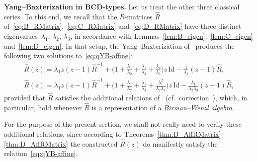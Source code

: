 \documentclass[10pt,a4paper]{amsart}
\numberwithin{equation}{section}
\newcommand{\Id}{\mathrm{Id}}
\begin{document}
\textbf{Yang--Baxterization in $\boldsymbol{BCD}$-types.}
Let us treat the other three classical series. To this end, we recall that the $R$-matrices $\hat{R}$ of~\eqref{eq:B_RMatrix},~\eqref{eq:C_RMatrix} and~\eqref{eq:D_RMatrix} have three distinct eigenvalues~$\lambda_1$, $\lambda_2$, $\lambda_3$, in accordance with Lemmas~\ref{lem:B_eigen},~\ref{lem:C_eigen} and~\ref{lem:D_eigen}. In that setup, the Yang--Baxterization of~\cite[equations~(3.29) and~(3.31)]{GWX} produces the following two solutions to~\eqref{eq:qYB-affine}:
\begin{gather}\label{eq:affinization_a}
 \hat{R}(z) =
 \lambda_{1}z(z - 1)\hat{R}^{-1} +
 \biggl(1 + \frac{\lambda_{1}}{\lambda_{2}} + \frac{\lambda_{1}}{\lambda_{3}} + \frac{\lambda_{2}}{\lambda_{3}}\biggr) z \,\Id
 - \frac{1}{\lambda_{3}}(z - 1)\hat{R},
\\ \label{eq:affinization_b}
 \hat{R}(z) = \lambda_{1}z(z - 1)\hat{R}^{-1} + \biggl(1 + \frac{\lambda_{1}}{\lambda_{2}} + \frac{\lambda_{1}}{\lambda_{3}} + \frac{\lambda_{1}^{2}}{\lambda_{2}\lambda_{3}}\biggr)z\,\Id - \frac{\lambda_{1}}{\lambda_{2}\lambda_{3}}(z - 1)\hat{R},
\end{gather}
provided that $\hat{R}$ satisfies the additional relations of~\cite[equation~(3.27)]{GWX} (cf.\ correction~\cite[equation~(A.9)]{GWX}), which, in particular, hold whenever $\hat{R}$ is a representation of a \emph{Birman--Wenzl algebra}.

\begin{Remark}
For the purpose of the present section, we shall not really need to verify these additional relations, since according to Theorems~\ref{thm:B_AffRMatrix}--\ref{thm:D_AffRMatrix} the constructed $\hat{R}(z)$ do manifestly satisfy the relation~\eqref{eq:qYB-affine}.
\end{Remark}
\end{document}
